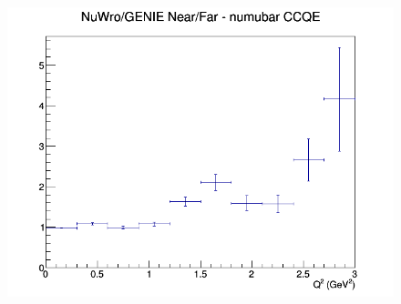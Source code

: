 \begin{figure}[h]
\endminipage
{}
\includegraphics[width=\linewidth]{eff_Q2/LAr/ratios/CCQE_NuWro_GENIE_numubar_NF_Q2.png}
\endminipage
\newline
\end{figure}
\clearpage
